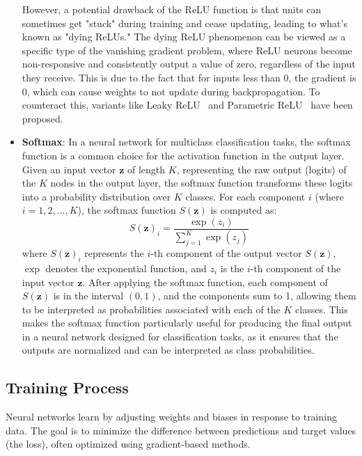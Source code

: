 \begin{itemize}
However, a potential drawback of the ReLU function is that units can sometimes get "stuck" during training and cease updating, leading to what's known as "dying ReLUs." The dying ReLU phenomenon can be viewed as a specific type of the vanishing gradient problem, where ReLU neurons become non-responsive and consistently output a value of zero, regardless of the input they receive. This is due to the fact that for inputs less than 0, the gradient is 0, which can cause weights to not update during backpropagation. To counteract this, variants like Leaky ReLU~\cite{maas2013rectifier} and Parametric ReLU~\cite{he2015delving} have been proposed.
\item \textbf{Softmax}:
In a neural network for multiclass classification tasks, the softmax function is a common choice for the activation function in the output layer. Given an input vector \( \mathbf{z} \) of length \( K \), representing the raw output (logits) of the \( K \) nodes in the output layer, the softmax function transforms these logits into a probability distribution over \( K \) classes. For each component \( i \) (where \( i = 1, 2, \ldots, K \)), the softmax function \( S(\mathbf{z}) \) is computed as:
\[
S(\mathbf{z})_i = \frac{{\exp(z_i)}}{{\sum_{j=1}^{K} \exp(z_j)}}
\]
where \( S(\mathbf{z})_i \) represents the \( i \)-th component of the output vector \( S(\mathbf{z}) \), \( \exp \) denotes the exponential function, and \( z_i \) is the \( i \)-th component of the input vector \( \mathbf{z} \). After applying the softmax function, each component of \( S(\mathbf{z}) \) is in the interval \( (0, 1) \), and the components sum to 1, allowing them to be interpreted as probabilities associated with each of the \( K \) classes. This makes the softmax function particularly useful for producing the final output in a neural network designed for classification tasks, as it ensures that the outputs are normalized and can be interpreted as class probabilities.

\end{itemize}

\subsection{Training Process}

Neural networks learn by adjusting weights and biases in response to training data. The goal is to minimize the difference between predictions and target values (the loss), often optimized using gradient-based methods.

